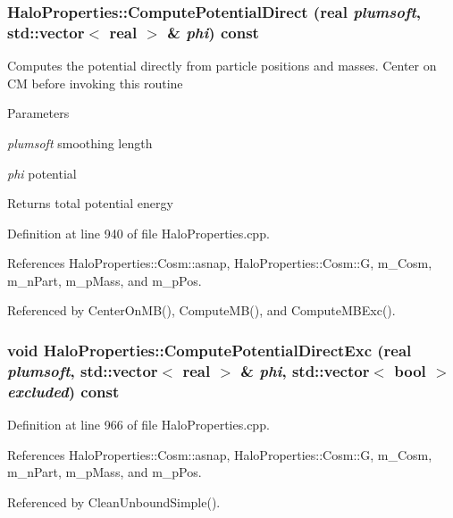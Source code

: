 \subsubsection[{ComputePotentialDirect}]{ HaloProperties::ComputePotentialDirect ({\bf real} {\em plumsoft}, \/  std::vector$<$ {\bf real} $>$ \& {\em phi}) const}\label{classHaloProperties_a78889a58d246ccfa468569ed6eafdc68}
Computes the potential directly from particle positions and masses. Center on CM before invoking this routine 
\begin{DoxyParams}{Parameters}
\item[{\em plumsoft}]smoothing length \item[{\em phi}]potential \end{DoxyParams}
\begin{DoxyReturn}{Returns}
total potential energy 
\end{DoxyReturn}


Definition at line 940 of file HaloProperties.cpp.



References HaloProperties::Cosm::asnap, HaloProperties::Cosm::G, m\_\-Cosm, m\_\-nPart, m\_\-pMass, and m\_\-pPos.



Referenced by CenterOnMB(), ComputeMB(), and ComputeMBExc().

\subsubsection[{ComputePotentialDirectExc}]{\setlength{\rightskip}{0pt plus 5cm}void HaloProperties::ComputePotentialDirectExc ({\bf real} {\em plumsoft}, \/  std::vector$<$ {\bf real} $>$ \& {\em phi}, \/  std::vector$<$ bool $>$ {\em excluded}) const}\label{classHaloProperties_a67050766e04467c84de53e83fefc139d}


Definition at line 966 of file HaloProperties.cpp.



References HaloProperties::Cosm::asnap, HaloProperties::Cosm::G, m\_\-Cosm, m\_\-nPart, m\_\-pMass, and m\_\-pPos.



Referenced by CleanUnboundSimple().

